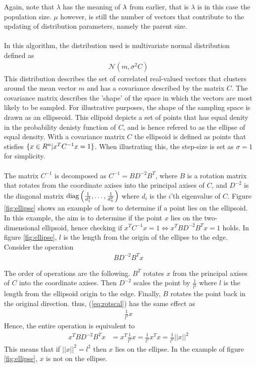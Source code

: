 Again, note that $\lambda$ has the meaning of $\lambda$ from earlier, that
is $\lambda$ is in this case the population size. $\mu$ however, is still the number
of vectors that contribute to the updating of distribution parameters, namely the 
parent size.\\
\\
In this algorithm, the distribution used is multivariate normal distribution defined
as 
\begin{align}
\mathcal{N} \left( m,  \sigma^2 C \right)
\end{align}
This distribution describes the set of correlated real-valued vectors that
clusters around the mean vector $m$ and has a covariance described by the
matrix $C$. The covariance matrix describes the 'shape' of the space in which 
the vectors are most likely to be sampled. For illustrative purposes,
the shape of the sampling space is drawn as an ellipseoid.
This ellipoid depicts a set of points that has equal denity 
in the probability denisty function of $C$, and is hence refered to 
as the ellipse of equal density.
With a covariance matrix $C$
the ellipsoid is defined as points that stisfies
$\{x \in R^{n} | x^{T} C^{-1} x = 1\}$.
When illustrating this, the step-size is set as $\sigma = 1$ for simplicity.\\
\\
The matrix $C^{-1}$ is decomposed as $C^{-1} = B D^{-2} B^T$, where $B$ is a rotation 
matrix that rotates from the coordinate axises into the principal axises of $C$, and 
$D^{-2}$ is the diagonal matrix 
$\text{diag} \left( \frac{1}{d_{1}^2},\dots, \frac{1}{d_{n}^2} \right)$
where $d_{i}$ is the $i$'th eigenvalue of $C$. Figure \ref{fig:ellipse} shows an example
of how to determine if a point lies on the ellipsoid. In this example, the aim is to 
determine if the point $x$ lies on the two-dimensional ellipsoid, hence checking if 
$x^{T} C^{-1} x = 1 \Leftrightarrow x^{T} B D^{-2} B^T x = 1 $ holds. In figure 
\ref{fig:ellipse}, $l$ is the length from the origin of the ellipse to the edge.
Consider the operation
\begin{align}
B D^{-2} B^T x \label{eq:rotscal}
\end{align}

The order of operations are the following. 
$B^{T}$ rotates $x$ from the principal axises of $C$
into the coordinate axises. Then $D^{-2}$ scales the point by $\frac{1}{l^2}$ where
$l$ is the length from the ellipsoid origin to the edge. Finally, $B$ rotates the point 
back in the original direction. thus, (\ref{eq:rotscal}) has the same effect as
\begin{align}
\frac{1}{l^2} x
\end{align}
Hence, the entire operation is equivalent to
\begin{align}
x^{T} B D^{-2} B^T x &= x^{T} \frac{1}{l^2} x = \frac{1}{l^2} x^{T} x
= \frac{1}{l^2} ||x||^2
\end{align}
This means that if $||x||^2 = l^2$ then $x$ lies on the ellipse.
In the example of figure \ref{fig:ellipse}, $x$ is not 
on the ellipse.


